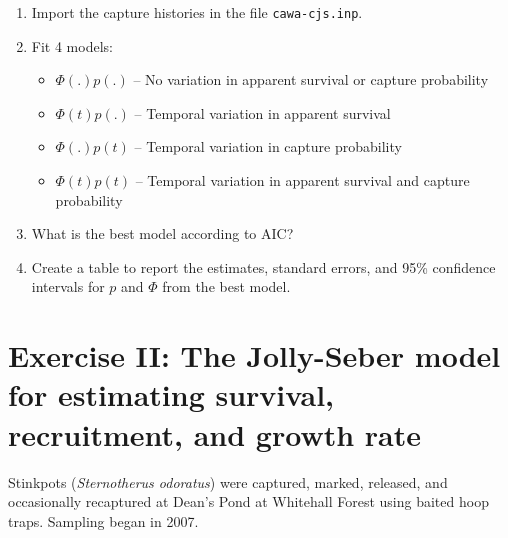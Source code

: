 \documentclass[12pt]{article}\usepackage[]{graphicx}\usepackage[]{color}
\begin{document}
\begin{enumerate}
  \item Import the capture histories in the file
    \texttt{cawa-cjs.inp}.
  \item Fit 4 models:
    \begin{itemize}
      \item $\Phi(.)p(.)$ -- No variation in apparent survival or capture probability
      \item $\Phi(t)p(.)$ -- Temporal variation in apparent survival
      \item $\Phi(.)p(t)$ -- Temporal variation in capture probability
      \item $\Phi(t)p(t)$ -- Temporal variation in apparent survival and capture probability
    \end{itemize}
  \item What is the best model according to AIC?
  \item Create a table to report the estimates, standard errors, and
    95\% confidence intervals for $p$ and $\Phi$ from the best model.
\end{enumerate}

  
\clearpage

\section*{\large  Exercise II: The Jolly-Seber model
  for estimating survival, recruitment, and growth rate}



Stinkpots ({\it Sternotherus odoratus}) were captured, marked,
released, and occasionally recaptured at Dean's Pond at Whitehall
Forest using baited hoop traps. Sampling began in 2007. 



\end{document}
